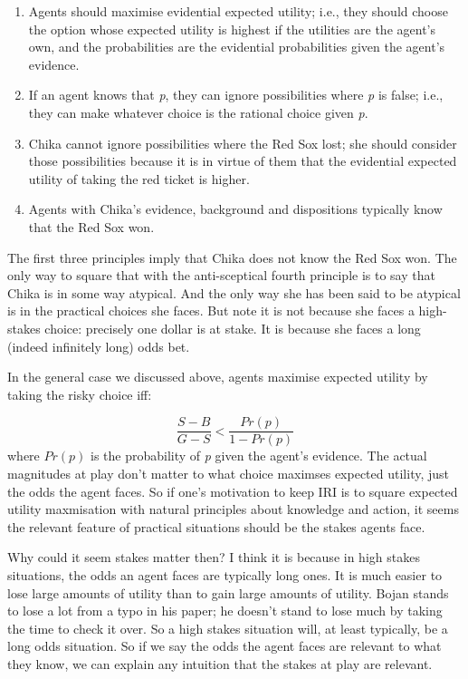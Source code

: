 \documentclass[11pt,oneside]{book}
\begin{document}
\begin{enumerate}
\item Agents should maximise evidential expected utility; i.e., they should choose the option whose expected utility is highest if the utilities are the agent's own, and the probabilities are the evidential probabilities given the agent's evidence.

\item If an agent knows that \emph{p}, they can ignore possibilities where \emph{p} is false; i.e., they can make whatever choice is the rational choice given \emph{p}.

\item Chika cannot ignore possibilities where the Red Sox lost; she should consider those possibilities because it is in virtue of them that the evidential expected utility of taking the red ticket is higher.

\item Agents with Chika's evidence, background and dispositions typically know that the Red Sox won.

\end{enumerate}
The first three principles imply that Chika does not know the Red Sox won. The only way to square that with the anti-sceptical fourth principle is to say that Chika is in some way atypical. And the only way she has been said to be atypical is in the practical choices she faces. But note it is not because she faces a high-stakes choice: precisely one dollar is at stake. It is because she faces a long (indeed infinitely long) odds bet.

In the general case we discussed above, agents maximise expected utility by taking the risky choice iff:

$$\frac{S-B}{G-S} < \frac{Pr(p)}{1-Pr(p)}$$
where $Pr(p)$ is the probability of \emph{p} given the agent's evidence. The actual magnitudes at play don't matter to what choice maximses expected utility, just the odds the agent faces. So if one's motivation to keep IRI is to square expected utility maxmisation with natural principles about knowledge and action, it seems the relevant feature of practical situations should be the stakes agents face.

Why could it seem stakes matter then? I think it is because in high stakes situations, the odds an agent faces are typically long ones. It is much easier to lose large amounts of utility than to gain large amounts of utility. Bojan stands to lose a lot from a typo in his paper; he doesn't stand to lose much by taking the time to check it over. So a high stakes situation will, at least typically, be a long odds situation. So if we say the odds the agent faces are relevant to what they know, we can explain any intuition that the stakes at play are relevant.
\end{document}
